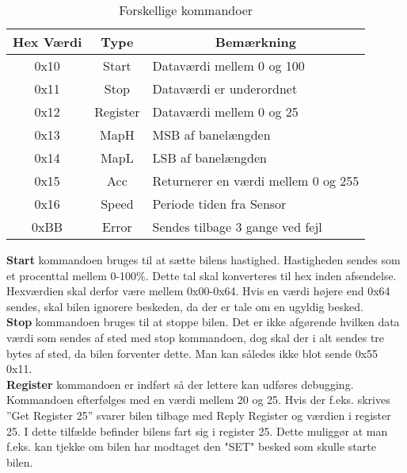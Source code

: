 \begin{table}[h]
\center
\begin{tabular}{|c|c|l|}
\hline
Hex Værdi & Type     &  \multicolumn{1}{c|}{Bemærkning}                                     \\ \hline
0x10      & Start    & Dataværdi mellem 0 og 100                      \\ \hline
0x11      & Stop     & Dataværdi er underordnet                       \\ \hline
0x12      & Register & Dataværdi mellem 0 og 25                       \\ \hline
0x13      & MapH     & MSB af banelængden                             \\ \hline
0x14      & MapL     & LSB af banelængden                             \\ \hline
0x15      & Acc      & Returnerer en værdi mellem 0 og 255            \\ \hline
0x16      & Speed    & Periode tiden fra Sensor                       \\ \hline
0xBB      & Error    & Sendes tilbage 3 gange ved fejl                \\ \hline
\end{tabular}
\caption{Forskellige kommandoer}
\label{forskel_kommando}
\end{table}

\textbf{Start} kommandoen bruges til at sætte bilens hastighed. Hastigheden sendes som et procenttal mellem 0-100\%. Dette tal skal konverteres til hex inden afsendelse. Hexværdien skal derfor være mellem 0x00-0x64. Hvis en værdi højere end 0x64 sendes, skal bilen ignorere beskeden, da der er tale om en ugyldig besked. \\

\textbf{Stop} kommandoen bruges til at stoppe bilen. Det er ikke afgørende hvilken data værdi som sendes af sted med stop kommandoen, dog skal der i alt sendes tre bytes af sted, da bilen forventer dette. Man kan således ikke blot sende 0x55 0x11. \\ 

\textbf{Register} kommandoen er indført så der lettere kan udføres debugging. Kommandoen efterfølges med en værdi mellem 20 og 25. Hvis der f.eks. skrives ”Get Register 25” svarer bilen tilbage med Reply Register og værdien i register 25. I dette tilfælde befinder bilens fart sig i register 25. Dette muliggør at man f.eks. kan tjekke om bilen har modtaget den "SET" besked som skulle starte bilen. \\

